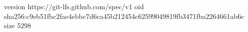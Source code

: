version https://git-lfs.github.com/spec/v1
oid sha256:c9eb51fbc2fae4ebbc7d6ca45b212454c62599049819fb3471fba2264661ab6c
size 5298
